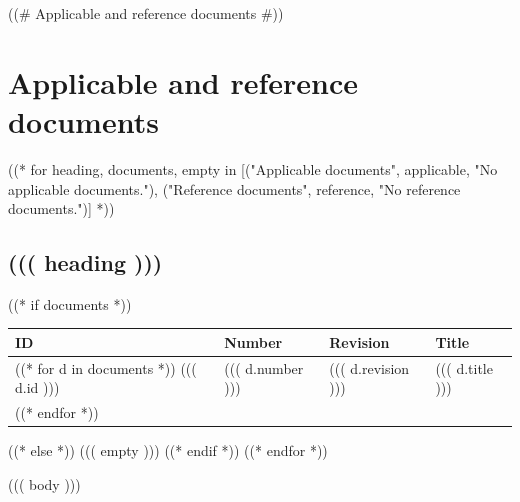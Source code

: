\documentclass[a4paper,10pt]{article}
\begin{document}
((# Applicable and reference documents #))
\section{Applicable and reference documents}
((* for heading, documents, empty in [("Applicable documents", applicable, "No applicable documents."),
                                     ("Reference documents", reference, "No reference documents.")] *))
\subsection{((( heading )))}
((* if documents *))
\begin{tabularx}{\linewidth}{@{}lllX@{}}
  \toprule
  \textbf{ID} & \textbf{Number} & \textbf{Revision} & \textbf{Title} \\
  \midrule
((* for d in documents *))
  ((( d.id ))) & ((( d.number ))) & ((( d.revision ))) & ((( d.title ))) \\
((* endfor *))
  \bottomrule
\end{tabularx}
((* else *))
((( empty )))
((* endif *))
((* endfor *))

((( body )))
\end{document}
